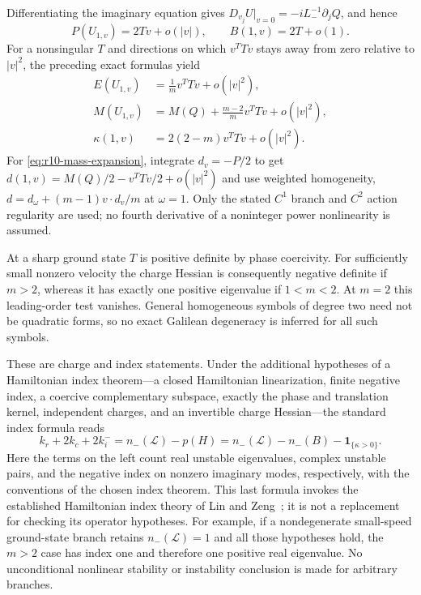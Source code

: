 Differentiating the imaginary equation gives
$D_{v_j}U|_{v=0}=-iL_-^{-1}\partial_jQ$, and hence
\begin{equation}\label{eq:r10-small-speed}
 P(U_{1,v})=2Tv+o(|v|),\qquad B(1,v)=2T+o(1).
\end{equation}
For a nonsingular $T$ and directions on which $v^TTv$ stays away
from zero relative to $|v|^2$, the preceding exact formulas yield
\begin{align}
 E(U_{1,v})&=\frac1m v^TTv+o(|v|^2),\label{eq:r10-energy-expansion}\\
 M(U_{1,v})&=M(Q)+\frac{m-2}{m}v^TTv+o(|v|^2),
 \label{eq:r10-mass-expansion}\\
 \kappa(1,v)&=2(2-m)v^TTv+o(|v|^2).
 \label{eq:r10-kappa-expansion}
\end{align}
For \eqref{eq:r10-mass-expansion}, integrate $d_v=-P/2$ to get
$d(1,v)=M(Q)/2-v^TTv/2+o(|v|^2)$ and use weighted homogeneity,
$d=d_\omega+(m-1)v\cdot d_v/m$ at $\omega=1$.
Only the stated $C^1$ branch and $C^2$ action regularity are used;
no fourth derivative of a noninteger power nonlinearity is assumed.

At a sharp ground state $T$ is positive definite by phase
coercivity.  For sufficiently small nonzero velocity the charge
Hessian is consequently negative definite if $m>2$, whereas it
has exactly one positive eigenvalue if $1<m<2$.
At $m=2$ this leading-order test vanishes.  General homogeneous
symbols of degree two need not be quadratic forms, so no exact
Galilean degeneracy is inferred for all such symbols.

These are charge and index statements.  Under the additional
hypotheses of a Hamiltonian index theorem---a closed Hamiltonian
linearization, finite negative index, a coercive complementary
subspace, exactly the phase and translation kernel, independent
charges, and an invertible charge Hessian---the standard index
formula reads
\begin{equation}\label{eq:r10-hamiltonian-index}
 k_r+2k_c+2k_i^-
 =n_-(\mathcal L)-p(H)
 =n_-(\mathcal L)-n_-(B)-\mathbf1_{\{\kappa>0\}}.
\end{equation}
Here the terms on the left count real unstable eigenvalues,
complex unstable pairs, and the negative index on nonzero
imaginary modes, respectively, with the conventions of the chosen
index theorem.  This last formula invokes the established
Hamiltonian index theory of Lin and Zeng~\cite{LZ}; it is not a replacement
for checking its operator hypotheses.  For example, if a
nondegenerate small-speed ground-state branch retains
$n_-(\mathcal L)=1$ and all those hypotheses hold, the $m>2$
case has index one and therefore one positive real eigenvalue.
No unconditional nonlinear stability or instability conclusion
is made for arbitrary branches.
